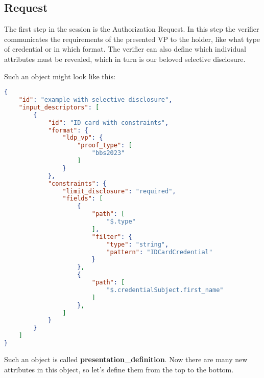\documentclass[
	a4paper               %
	,bibliography=totoc   %
	,listof=totoc         %
	,monolingual
]{bfhthesis}              %
\begin{document}
\subsection{Request}
The first step in the session is the Authorization Request. 
In this step the verifier communicates the requirements of the presented VP to the holder, like what type of credential or in which format.
The verifier can also define which individual attributes must be revealed, which in turn is our beloved selective disclosure.

Such an object might look like this:
\begin{lstlisting}[language=json,firstnumber=1,caption={Example of a presentation definition},captionpos=b, label={list:presdef}]
{
	"id": "example with selective disclosure",
	"input_descriptors": [
		{
			"id": "ID card with constraints",
			"format": {
				"ldp_vp": {
					"proof_type": [
						"bbs2023"
					]
				}
			},
			"constraints": {
				"limit_disclosure": "required",
				"fields": [
					{
						"path": [
							"$.type"
						],
						"filter": {
							"type": "string",
							"pattern": "IDCardCredential"
						}
					},
					{
						"path": [
							"$.credentialSubject.first_name"
						]
					},
				]
			}
		}
	]
}
\end{lstlisting}

Such an object is called \textbf{presentation\_definition}.
Now there are many new attributes in this object, so let's define them from the top to the bottom. \\
\end{document}
